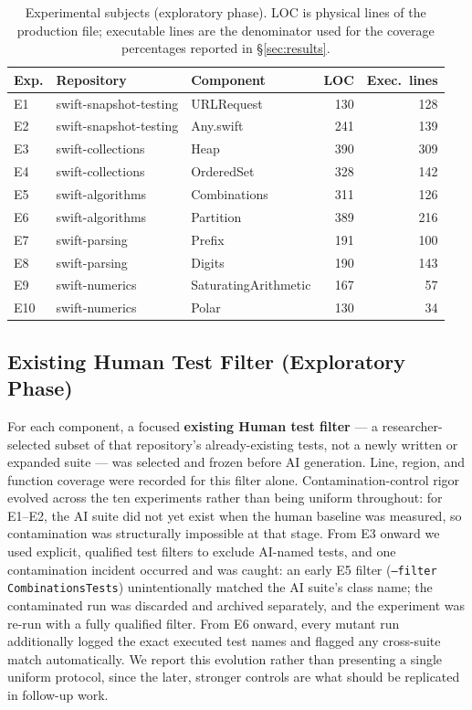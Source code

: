 \documentclass[10pt,conference]{IEEEtran}
\begin{document}
\begin{table}[ht]
\centering
\caption{Experimental subjects (exploratory phase). LOC is physical lines of the production file; executable lines are the denominator used for the coverage percentages reported in \S\ref{sec:results}.}
\label{tab:subjects}
\small
\begin{tabular}{lllrr}
\toprule
Exp. & Repository & Component & LOC & Exec.\ lines \\
\midrule
E1 & swift-snapshot-testing & URLRequest & 130 & 128 \\
E2 & swift-snapshot-testing & Any.swift & 241 & 139 \\
E3 & swift-collections & Heap & 390 & 309 \\
E4 & swift-collections & OrderedSet & 328 & 142 \\
E5 & swift-algorithms & Combinations & 311 & 126 \\
E6 & swift-algorithms & Partition & 389 & 216 \\
E7 & swift-parsing & Prefix & 191 & 100 \\
E8 & swift-parsing & Digits & 190 & 143 \\
E9 & swift-numerics & SaturatingArithmetic & 167 & 57 \\
E10 & swift-numerics & Polar & 130 & 34 \\
\bottomrule
\end{tabular}
\end{table}

\subsection{Existing Human Test Filter (Exploratory Phase)}
\label{sec:humanbaseline}
For each component, a focused \textbf{existing Human test filter} — a researcher-selected subset of that repository's already-existing tests, not a newly written or expanded suite — was selected and frozen before AI generation. Line, region, and function coverage were recorded for this filter alone. Contamination-control rigor evolved across the ten experiments rather than being uniform throughout: for E1--E2, the AI suite did not yet exist when the human baseline was measured, so contamination was structurally impossible at that stage. From E3 onward we used explicit, qualified test filters to exclude AI-named tests, and one contamination incident occurred and was caught: an early E5 filter (\texttt{--filter CombinationsTests}) unintentionally matched the AI suite's class name; the contaminated run was discarded and archived separately, and the experiment was re-run with a fully qualified filter. From E6 onward, every mutant run additionally logged the exact executed test names and flagged any cross-suite match automatically. We report this evolution rather than presenting a single uniform protocol, since the later, stronger controls are what should be replicated in follow-up work.
\end{document}
